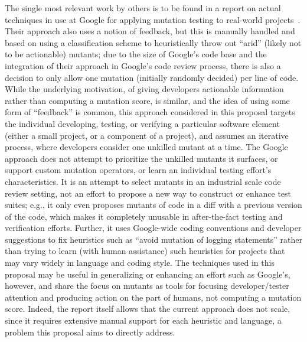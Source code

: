 The single most relevant work by others is to be found in a
report on actual techniques in use at Google for applying mutation
testing to real-world projects~\cite{MutGoogle}.  Their approach also
uses a notion of feedback, but this is manually handled and based on
using a classification scheme to heuristically throw out ``arid''
(likely not to be actionable)
mutants; due to the size of Google's code base and the integration of
their approach in Google's code review process, there is also a
decision to only allow one mutation (initially randomly decided) per
line of code.  While the underlying motivation, of giving developers
actionable information rather than computing a mutation score, is
similar, and the idea of using some form of ``feedback'' is common,
this approach considered in this proposal targets the individual developing, testing, or verifying a particular software
element (either a small project, or a component of a project), and
assumes an iterative process, where developers consider one unkilled
mutant at a time.  The Google approach does not attempt to prioritize
the unkilled mutants it surfaces, or support custom mutation
operators, or learn an individual testing effort's characteristics.
It is an attempt to select mutants
in an industrial scale code review setting, not an effort to propose a
new way to construct or enhance test suites; e.g., it only even
proposes mutants of code in a diff with a previous version of the
code, which makes it completely unusable in after-the-fact testing and
verification efforts.  Further, it uses
Google-wide coding conventions and developer suggestions to fix
heuristics such as ``avoid mutation of logging statements'' rather
than trying to learn (with human assistance) such heuristics for
projects that may vary widely in language and coding style.
The techniques used in this proposal may be useful in generalizing or enhancing an
effort such as Google's, however, and share the focus on mutants as
tools for focusing developer/tester attention and producing action on the
part of humans, not computing a mutation score.  Indeed, the report
itself allows that the current approach does not scale, since it
requires extensive manual support for each heuristic and language, a
problem this proposal aims to directly address.

